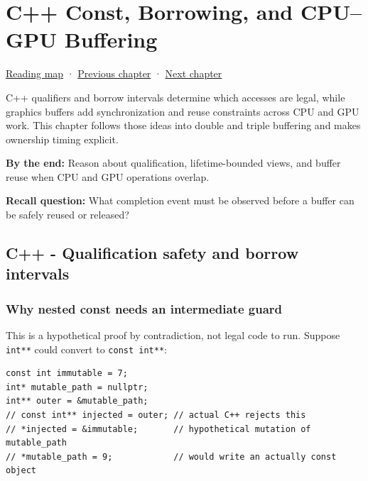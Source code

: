 \chapter{C++ Const, Borrowing, and CPU--GPU Buffering}\label{01-foundations-i-ch011-c-const-borrowing-and-cpugpu-buffering}\hypertarget{01-foundations-i-ch011}{}\label{stagechapter:01-foundations-i-ch011}

\hypertarget{01-foundations-i-ch011-c-const-borrowing-and-cpugpu-buffering}{}

\hyperref[volume-reading-map]{Reading map} · \hyperref[01-foundations-i-ch010-reproducible-builds-profiling-and-repository-contracts]{Previous chapter} · \hyperref[01-foundations-i-ch012-commands-async-work-and-resource-lifetimes]{Next chapter}

C++ qualifiers and borrow intervals determine which accesses are legal, while graphics buffers add synchronization and reuse constraints across CPU and GPU work. This chapter follows those ideas into double and triple buffering and makes ownership timing explicit.

\textbf{By the end:} Reason about qualification, lifetime-bounded views, and buffer reuse when CPU and GPU operations overlap.

\textbf{Recall question:} What completion event must be observed before a buffer can be safely reused or released?

\section{C++ - Qualification safety and borrow intervals}\label{01-foundations-i-ch011-c---qualification-safety-and-borrow-intervals}

\hypertarget{01-foundations-i-ch011-c---qualification-safety-and-borrow-intervals}{}

\subsection{Why nested const needs an intermediate guard}\label{01-foundations-i-ch011-why-nested-const-needs-an-intermediate-guard}

\hypertarget{01-foundations-i-ch011-why-nested-const-needs-an-intermediate-guard}{}

This is a hypothetical proof by contradiction, not legal code to run. Suppose \texttt{int**} could convert to \texttt{const\ int**}:

\begin{verbatim}
const int immutable = 7;
int* mutable_path = nullptr;
int** outer = &mutable_path;
// const int** injected = outer; // actual C++ rejects this
// *injected = &immutable;       // hypothetical mutation of mutable_path
// *mutable_path = 9;            // would write an actually const object
\end{verbatim}

